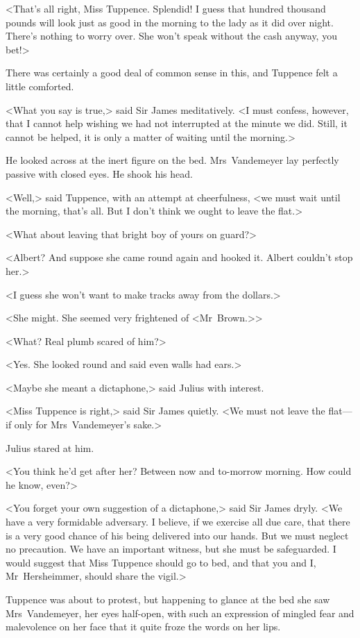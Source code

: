 <That's all right, Miss Tuppence. Splendid! I guess that hundred thousand pounds will look just as good in the morning to the lady as it did over night. There's nothing to worry over. She won't speak without the cash anyway, you bet!>

There was certainly a good deal of common sense in this, and Tuppence felt a little comforted.

<What you say is true,> said Sir James meditatively. <I must confess, however, that I cannot help wishing we had not interrupted at the minute we did. Still, it cannot be helped, it is only a matter of waiting until the morning.>

He looked across at the inert figure on the bed. Mrs~Vandemeyer lay perfectly passive with closed eyes. He shook his head.

<Well,> said Tuppence, with an attempt at cheerfulness, <we must wait until the morning, that's all. But I don't think we ought to leave the flat.>

<What about leaving that bright boy of yours on guard?>

<Albert? And suppose she came round again and hooked it. Albert couldn't stop her.>

<I guess she won't want to make tracks away from the dollars.>

<She might. She seemed very frightened of <Mr~Brown.>>

<What? Real plumb scared of him?>

<Yes. She looked round and said even walls had ears.>

<Maybe she meant a dictaphone,> said Julius with interest.

<Miss Tuppence is right,> said Sir James quietly. <We must not leave the flat—if only for Mrs~Vandemeyer's sake.>

Julius stared at him.

<You think he'd get after her? Between now and to-morrow morning. How could he know, even?>

<You forget your own suggestion of a dictaphone,> said Sir James dryly. <We have a very formidable adversary. I believe, if we exercise all due care, that there is a very good chance of his being delivered into our hands. But we must neglect no precaution. We have an important witness, but she must be safeguarded. I would suggest that Miss Tuppence should go to bed, and that you and I, Mr~Hersheimmer, should share the vigil.>

Tuppence was about to protest, but happening to glance at the bed she saw Mrs~Vandemeyer, her eyes half-open, with such an expression of mingled fear and malevolence on her face that it quite froze the words on her lips.

